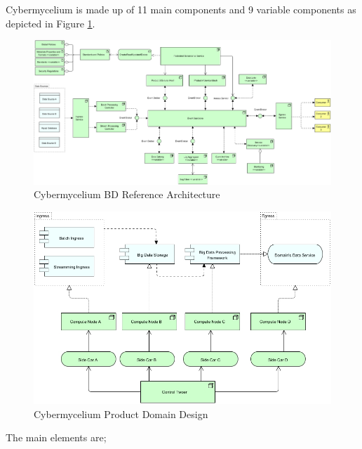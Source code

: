 \documentclass{bmcart}
\begin{document}
Cybermycelium is made up of 11 main components and 9 variable components as depicted in Figure \ref{fig:Cybermycelium}.




\begin{figure}
        \includegraphics[width=23cm]{Media/Cybermycelium.jpg}
        \caption{Cybermycelium BD Reference Architecture}
        \label{fig:Cybermycelium}
\end{figure}


\begin{figure}[h!]
    \centering
    \includegraphics[width=12cm]{Media/Product Domain.jpg}
    \caption{Cybermycelium Product Domain Design}
    \label{fig:Cybermycelium Product Domain Design}
\end{figure}


The main elements are;
\end{document}
